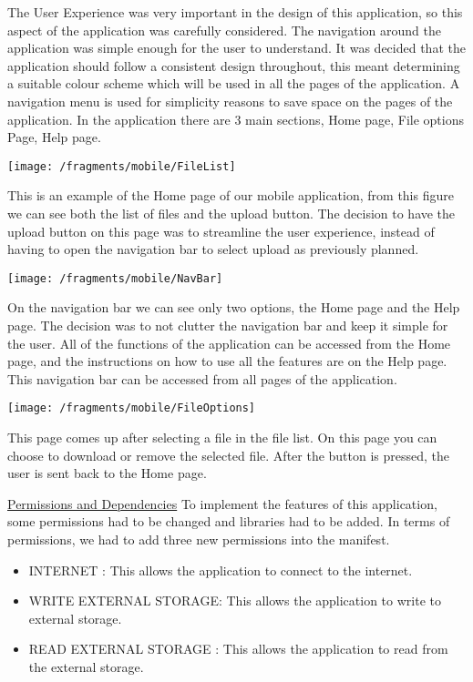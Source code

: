 \documentclass{article}
\begin{document}
The User Experience was very important in the design of this application, so this aspect of the application was carefully considered. The navigation around the application was simple enough for the user to understand. It was decided that the application should follow a consistent design throughout, this meant determining a suitable colour scheme which will be used in all the pages of the application. A navigation menu is used for simplicity reasons to save space on the pages of the application. In the application there are 3 main sections, Home page, File options Page, Help page. 
\begin{center}
\texttt{[image: /fragments/mobile/FileList]}
\end{center}
This is an example of the Home page of our mobile application, from this figure we can see both the list of files and the upload button. The decision to have the upload button on this page was to streamline the user experience, instead of having to open the navigation bar to select upload as previously planned. 
\begin{center}
\texttt{[image: /fragments/mobile/NavBar]}
\end{center}
On the navigation bar we can see only two options, the Home page and the Help page. The decision was to not clutter the navigation bar and keep it simple for the user. All of the functions of the application can be accessed from the Home page, and the instructions on how to use all the features are on the Help page. This navigation bar can be accessed from all pages of the application.
\begin{center}
\texttt{[image: /fragments/mobile/FileOptions]}
\end{center}
This page comes up after selecting a file in the file list. On this page you can choose to download or remove the selected file. After the button is pressed, the user is sent back to the Home page.



\underline{Permissions and Dependencies}
To implement the features of this application, some permissions had to be changed and libraries had to be added. In terms of permissions, we had to add three new permissions into the manifest. 

\begin{itemize}
\item INTERNET : This allows the application to connect to the internet.
\item WRITE EXTERNAL STORAGE: This allows the application to write to external storage.
\item READ EXTERNAL STORAGE : This allows the application to read from the external storage.
\end{itemize}
\end{document}
